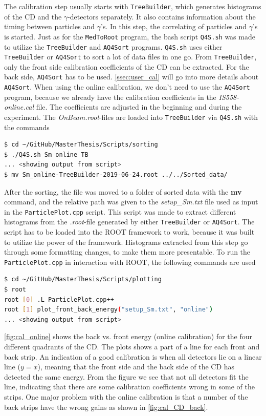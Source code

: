 \documentclass[twoside,english]{uiofysmaster/uiofysmaster}
\newcommand{\ga}{$\gamma$}
\let\orgautoref\autoref
\renewcommand{\autoref}
        {%
		 \def\subsectionautorefname{Section}%
		 \def\subsubsectionautorefname{Section}%
          \orgautoref}
\begin{document}
The calibration step usually starts with \texttt{TreeBuilder}, which generates histograms of the CD and the \ga-detectors separately. 
It also contains information about the timing between particles and \ga's. 
In this step, the correlating of particles and \ga's is started.
Just as for the \texttt{MedToRoot} program, the bash script \texttt{Q4S.sh} was made to utilize the \texttt{TreeBuilder} and \texttt{AQ4Sort} programs. 
\texttt{Q4S.sh} uses either \texttt{TreeBuilder} or \texttt{AQ4Sort} to sort a lot of data files in one go.
From \texttt{TreeBuilder}, only the front side calibration coefficients of the CD can be extracted. 
For the back side, \texttt{AQ4Sort} has to be used.
\autoref{ssec:user_cal} will go into more details about \texttt{AQ4Sort}.
When using the online calibration, we don't need to use the \texttt{AQ4Sort} program, because we already have the calibration coefficients in the \textit{IS558-online.cal} file. 
The coefficients are adjusted in the beginning and during the experiment.
The \textit{OnBeam.root}-files are loaded into \texttt{TreeBuilder} via \texttt{Q4S.sh} with the commands
\begin{lstlisting}[language=sh]
$ cd ~/GitHub/MasterThesis/Scripts/sorting 
$ ./Q4S.sh Sm online TB
... <showing output from script>
$ mv Sm_online-TreeBuilder-2019-06-24.root ../../Sorted_data/
\end{lstlisting}
After the sorting, the file was moved to a folder of sorted data with the \textbf{mv} command, and the relative path was given to the \textit{setup\_Sm.txt} file used as input in the \texttt{ParticlePlot.cpp} script. 
This script was made to extract different histograms from the \textit{.root}-file generated by either \texttt{TreeBuilder} or \texttt{AQ4Sort}.
The script has to be loaded into the ROOT framework to work, because it was built to utilize the power of the framework.
Histograms extracted from this step go through some formatting changes, to make them more presentable.
To run the \texttt{ParticlePlot.cpp} in interaction with ROOT, the following commands are used
\begin{lstlisting}[language=sh]
$ cd ~/GitHub/MasterThesis/Scripts/plotting 
$ root
root [0] .L ParticlePlot.cpp++
root [1] plot_front_back_energy("setup_Sm.txt", "online")
... <showing output from script>
\end{lstlisting}

\autoref{fig:cal_online} shows the back vs. front energy (online calibration) for the four different quadrants of the CD. 
The plots shows a part of a line for each front and back strip. An indication of a good calibration is when all detectors lie on a linear line ($y = x$), meaning that the front side and the back side of the CD has detected the same energy. 
From the figure we see that not all detectors fit the line, indicating that there are some calibration coefficients wrong in some of the strips.
One major problem with the online calibration is that a number of the back strips have the wrong gains as shown in \autoref{fig:cal_CD_back}.
\end{document}
